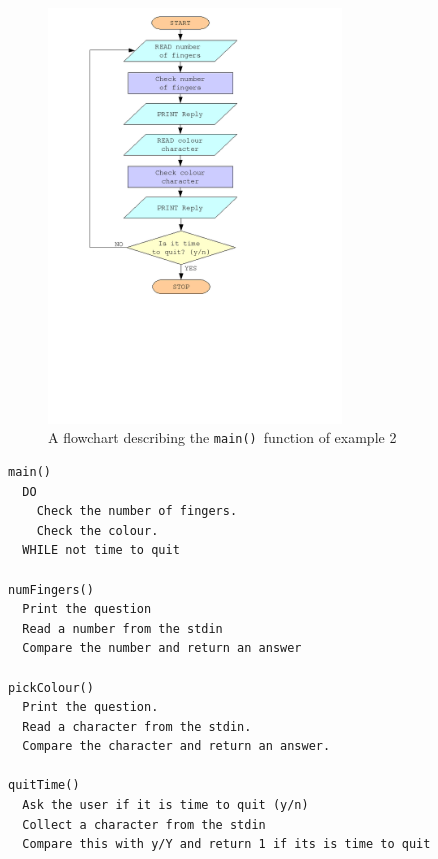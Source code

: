 \documentclass[11pt]{scrartcl}
\def\main{\texttt{main()}}
\begin{document}
\begin{figure}[h]
\begin{center}
\includegraphics[height=11cm]{figures/ex2}
\caption{A flowchart describing the \main\ function of example 2
\label{figure:flowchart_ex2}}
\end{center}
\end{figure}

\begin{pseudocode}[h]
\begin{verbatim}
main()
  DO
    Check the number of fingers.
    Check the colour.
  WHILE not time to quit

numFingers()
  Print the question
  Read a number from the stdin
  Compare the number and return an answer

pickColour()
  Print the question.
  Read a character from the stdin.
  Compare the character and return an answer.

quitTime()
  Ask the user if it is time to quit (y/n)
  Collect a character from the stdin
  Compare this with y/Y and return 1 if its is time to quit
\end{verbatim}
\caption{Example 2 in pseudocode \label{pseudo:ex2}}
\end{pseudocode}
\end{document}
